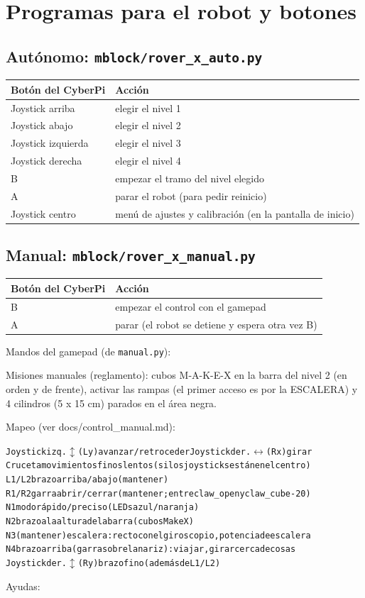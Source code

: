 \section{Programas para el robot y botones}
\subsection{Autónomo: \texttt{mblock/rover\_x\_auto.py}}
\begin{center}\begin{tabular}{@{}ll@{}}\toprule
\textbf{Bot\'on del CyberPi} & \textbf{Acci\'on} \\\midrule
Joystick arriba & elegir el nivel 1 \\
Joystick abajo & elegir el nivel 2 \\
Joystick izquierda & elegir el nivel 3 \\
Joystick derecha & elegir el nivel 4 \\
B & empezar el tramo del nivel elegido \\
A & parar el robot (para pedir reinicio) \\
Joystick centro & men\'u de ajustes y calibraci\'on (en la pantalla de inicio) \\
\bottomrule\end{tabular}\end{center}
\subsection{Manual: \texttt{mblock/rover\_x\_manual.py}}
\begin{center}\begin{tabular}{@{}ll@{}}\toprule
\textbf{Bot\'on del CyberPi} & \textbf{Acci\'on} \\\midrule
B & empezar el control con el gamepad \\
A & parar (el robot se detiene y espera otra vez B) \\
\bottomrule\end{tabular}\end{center}
Mandos del gamepad (de \texttt{manual.py}):

Misiones manuales (reglamento): cubos M-A-K-E-X en la barra del nivel 2 (en orden y de frente), activar las rampas (el primer acceso es por la ESCALERA) y 4 cilindros (5 x 15 cm) parados en el área negra.

Mapeo (ver docs/control\_manual.md):

{\small\begin{alltt}
Joystick izq. \(\updownarrow\) (Ly)  avanzar / retroceder      Joystick der. \(\leftrightarrow\) (Rx)  girar
Cruceta               movimientos finos lentos (si los joysticks están en el centro)
L1 / L2               brazo arriba / abajo (mantener)
R1 / R2               garra abrir / cerrar (mantener; entre claw\_open y claw\_cube - 20\textdegree{})
N1                    modo rápido / preciso (LEDs azul / naranja)
N2                    brazo a la altura de la barra (cubos MakeX)
N3 (mantener)         escalera: recto con el giroscopio, potencia de escalera
N4                    brazo arriba (garra sobre la nariz): viajar, girar cerca de cosas
Joystick der. \(\updownarrow\) (Ry)  brazo fino (además de L1/L2)
\end{alltt}}
Ayudas:

